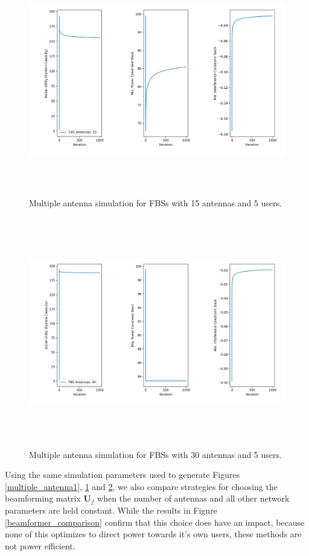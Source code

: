 \documentclass[12pt,a4paper]{report}
\begin{document}
\begin{figure}[H]\label{multiple_antenna2}
	\includegraphics[width=\textwidth,height = 10cm]{figures/multiple_antenna2}
	  \caption{Multiple antenna simulation for FBSs with 15 antennas and 5 users.
	  }
\end{figure}

\begin{figure}[H]\label{multiple_antenna3}
	\includegraphics[width=\textwidth,height = 10cm]{figures/multiple_antenna3}
	  \caption{Multiple antenna simulation for FBSs with 30 antennas and 5 users.
	  }
\end{figure}


Using the same simulation parameters used to generate Figures \ref{multiple_antenna1}, \ref{multiple_antenna2} and \ref{multiple_antenna3}, we also compare strategies for choosing the beamforming matrix $\mathbf{U}_f$ when the number of antennas and all other network parameters are held constant. While the results in Figure \ref{beamformer_comparison} confirm that this choice does have an impact, because none of this optimizes to direct power towards it's own users, these methods are not power efficient. 
\end{document}
